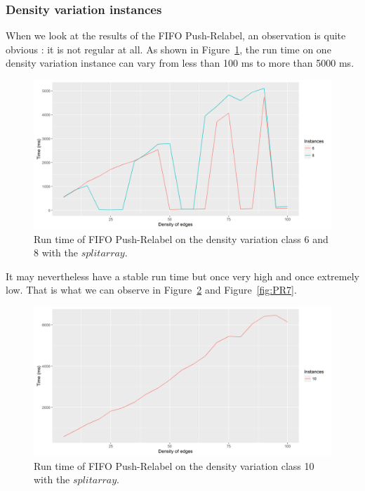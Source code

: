 \subsubsection{Density variation instances}
When we look at the results of the FIFO Push-Relabel, an observation is quite obvious : it is not regular at all. As shown in Figure~\ref{fig:PR6}, the run time on one density variation instance can vary from less than 100 ms to more than 5000 ms.
\begin{figure}[H]
\begin{center}
\includegraphics[scale=0.45]{images/results/pri68.png}
\caption{Run time of FIFO Push-Relabel on the density variation class 6 and 8 with the $split array$.}
\label{fig:PR6}
\end{center}
\end{figure}
It may nevertheless have a stable run time but once very high and once extremely low. That is what we can observe in Figure~\ref{fig:PR10} and Figure~\ref{fig:PR7}.
\begin{figure}[H]
\begin{center}
\includegraphics[scale=0.45]{images/results/pri10.png}
\caption{Run time of FIFO Push-Relabel on the density variation class 10 with the $split array$.}
\label{fig:PR10}
\end{center}
\end{figure}
